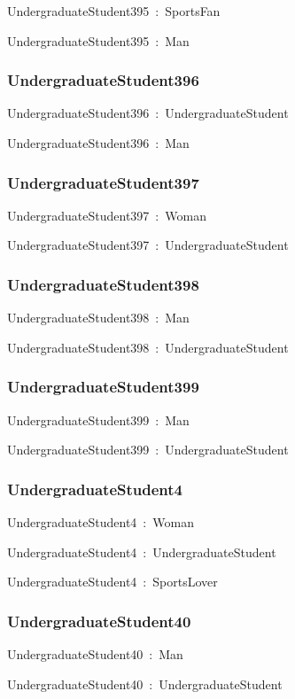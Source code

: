 \documentclass{article}
\begin{document}
UndergraduateStudent395~:~SportsFan

UndergraduateStudent395~:~Man

\subsubsection*{UndergraduateStudent396}

UndergraduateStudent396~:~UndergraduateStudent

UndergraduateStudent396~:~Man

\subsubsection*{UndergraduateStudent397}

UndergraduateStudent397~:~Woman

UndergraduateStudent397~:~UndergraduateStudent

\subsubsection*{UndergraduateStudent398}

UndergraduateStudent398~:~Man

UndergraduateStudent398~:~UndergraduateStudent

\subsubsection*{UndergraduateStudent399}

UndergraduateStudent399~:~Man

UndergraduateStudent399~:~UndergraduateStudent

\subsubsection*{UndergraduateStudent4}

UndergraduateStudent4~:~Woman

UndergraduateStudent4~:~UndergraduateStudent

UndergraduateStudent4~:~SportsLover

\subsubsection*{UndergraduateStudent40}

UndergraduateStudent40~:~Man

UndergraduateStudent40~:~UndergraduateStudent
\end{document}

